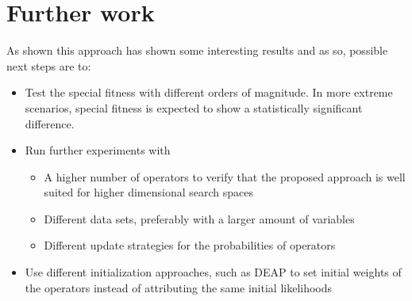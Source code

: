 \documentclass[12pt]{article}
\begin{document}
\section*{Further work}
As shown this approach has shown some interesting results and as so, possible next steps are to:
\begin{itemize}
  \item Test the special fitness with different orders of magnitude. In more extreme scenarios, special fitness is expected to show a statistically significant difference.
  \item Run further experiments with
    \begin{itemize}
        \item A higher number of operators to verify  that the proposed approach is well suited for higher dimensional search spaces
        \item Different data sets, preferably with a larger amount of variables
        \item Different update strategies for the probabilities of operators
    \end{itemize}
  \item Use different initialization approaches, such as DEAP to set initial weights of the operators instead of attributing the same initial likelihoods
\end{itemize}


\end{document}
